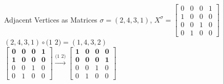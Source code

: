 \documentclass{beamer}
\theoremstyle{plain}
\theoremstyle{definition}
\begin{document}
\begin{frame}{Adjacent Vertices as Matrices}
     $\sigma = (2,4,3,1)$, 
     $X^{\sigma} =\begin{bmatrix}
        0 & 0 & 0 & 1 \\ 1 & 0 & 0 & 0 \\ 0 & 0 & 1 & 0 \\ 0 & 1 & 0 & 0
    \end{bmatrix} $ \\ \vspace{0.3cm}
    $(2,4,3,1) \circ (1$ $2) = (1,4,3,2)$ \\ \vspace{0.3cm}
    $\begin{bmatrix}
        \mathbf{0} &  \mathbf{0} &  \mathbf{0} & \mathbf{1} \\ \mathbf{1} &  \mathbf{0} &  \mathbf{0} & \mathbf{0} \\ 0 & 0 & 1 & 0 \\ 0 & 1 & 0 & 0
    \end{bmatrix}  \stackrel{\text{(1 2)}}{\longrightarrow} \begin{bmatrix}
        \mathbf{1} &  \mathbf{0} &  \mathbf{0} & \mathbf{0} \\ \mathbf{0} &  \mathbf{0} &  \mathbf{0} & \mathbf{1} \\ 0 & 0 & 1 & 0 \\ 0 & 1 & 0 & 0
    \end{bmatrix}
    $
    
\end{frame}
\end{document}
